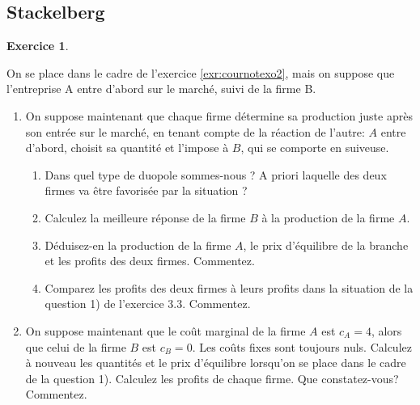 \documentclass[
]{book}
\providecommand{\tightlist}{%
  \setlength{\itemsep}{0pt}\setlength{\parskip}{0pt}}
\theoremstyle{definition}
\theoremstyle{definition}
\theoremstyle{definition}
\newtheorem{exercise}{Exercice}[chapter]
\theoremstyle{definition}
\theoremstyle{remark}
\begin{document}
\hypertarget{stackelberg}{%
\subsection{Stackelberg}\label{stackelberg}}

\begin{exercise}
\protect\hypertarget{exr:stackexo1}{}\label{exr:stackexo1}

On se place dans le cadre de l'exercice \ref{exr:cournotexo2}, mais on suppose que l'entreprise A entre d'abord sur le marché, suivi de la firme B.

\begin{enumerate}
\def\labelenumi{\arabic{enumi}.}
\tightlist
\item
  On suppose maintenant que chaque firme détermine sa production juste après son entrée sur le marché, en tenant compte de la réaction de l'autre: \(A\) entre d'abord, choisit sa quantité et l'impose à \(B\), qui se comporte en suiveuse.

  \begin{enumerate}
  \def\labelenumii{\alph{enumii}.}
  \tightlist
  \item
    Dans quel type de duopole sommes-nous ? A priori laquelle des deux firmes va être favorisée par la situation ?
  \item
    Calculez la meilleure réponse de la firme \(B\) à la production de la firme \(A\).
  \item
    Déduisez-en la production de la firme \(A\), le prix d'équilibre de la branche et les profits des deux firmes. Commentez.
  \item
    Comparez les profits des deux firmes à leurs profits dans la situation de la question 1) de l'exercice 3.3. Commentez.
  \end{enumerate}
\item
  On suppose maintenant que le coût marginal de la firme \(A\) est \(c_A=4\), alors que celui de la firme \(B\) est \(c_B=0\). Les coûts fixes sont toujours nuls.
  Calculez à nouveau les quantités et le prix d'équilibre lorsqu'on se place dans le cadre de la question 1). Calculez les profits de chaque firme. Que constatez-vous? Commentez.
\end{enumerate}

\end{exercise}
\end{document}
